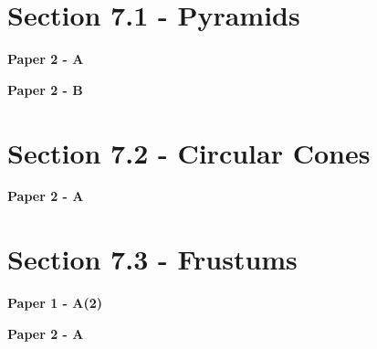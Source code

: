 \documentclass[12pt, a4paper]{article}
\begin{document}
\section*{Section 7.1 - Pyramids}\label{section:3-7-1}

\textbf{Paper 2 - A}
\begin{enumx}[label=\arabic*.,start=1]
\item {}\label{DSE2019-CoreP2-Q15} 
\end{enumx}
\textbf{Paper 2 - B}
\begin{enumx}[label=\arabic*.,start=2]
\item {}\label{DSE2013-CoreP2-Q40} 
\end{enumx}




\section*{Section 7.2 - Circular Cones}\label{section:3-7-2}

\textbf{Paper 2 - A}
\begin{enumx}[label=\arabic*.,start=3]
\item {}\label{DSE2012P-CoreP2-Q16} 
\item {}\label{DSE2017-CoreP2-Q15} 
\item {}\label{DSE2020-CoreP2-Q16} 
\item {}\label{DSE2024-CoreP2-Q16} 
\end{enumx}




\section*{Section 7.3 - Frustums}\label{section:3-7-3}

\textbf{Paper 1 - A(2)}
\begin{enumx}[label=\arabic*.,start=7]
\item {}\label{DSE2014-CoreP1-Q14} 
\end{enumx}
\textbf{Paper 2 - A}
\begin{enumx}[label=\arabic*.,start=8]
\item {}\label{DSE2015-CoreP2-Q16} 
\end{enumx}
\end{document}

